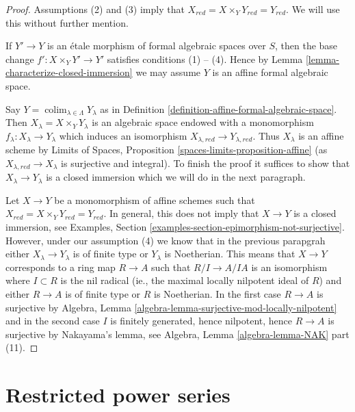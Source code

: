\documentclass{stacks-project}
\theoremstyle{plain}
\theoremstyle{definition}
\theoremstyle{remark}
\numberwithin{equation}{subsection}
\def\colim{\mathop{\mathrm{colim}}\nolimits}
\begin{document}
\begin{proof}
Assumptions (2) and (3) imply that
$X_{red} = X \times_Y Y_{red} = Y_{red}$.
We will use this without further mention.

\medskip\noindent
If $Y' \to Y$ is an \'etale morphism of formal algebraic spaces over $S$,
then the base change $f' : X \times_Y Y' \to Y'$ satisfies conditions
(1) -- (4). Hence by Lemma \ref{lemma-characterize-closed-immersion}
we may assume $Y$ is an affine formal algebraic space.

\medskip\noindent
Say $Y = \colim_{\lambda \in \Lambda} Y_\lambda$ as in
Definition \ref{definition-affine-formal-algebraic-space}.
Then $X_\lambda = X \times_Y Y_\lambda$ is an algebraic space
endowed with a monomorphism $f_\lambda : X_\lambda \to Y_\lambda$
which induces an isomorphism $X_{\lambda, red} \to Y_{\lambda, red}$.
Thus $X_\lambda$ is an affine scheme by
Limits of Spaces, Proposition \ref{spaces-limits-proposition-affine}
(as $X_{\lambda, red} \to X_\lambda$ is surjective and integral).
To finish the proof it suffices to show that
$X_\lambda \to Y_\lambda$ is a closed immersion
which we will do in the next paragraph.

\medskip\noindent
Let $X \to Y$ be a monomorphism of affine schemes such that
$X_{red} = X \times_Y Y_{red} = Y_{red}$. In general, this does
not imply that $X \to Y$ is a closed immersion, see
Examples, Section \ref{examples-section-epimorphism-not-surjective}.
However, under our assumption (4) we know that in the previous parapgrah
either $X_\lambda \to Y_\lambda$ is of finite type or $Y_\lambda$
is Noetherian. This means that
$X \to Y$ corresponds to a ring map $R \to A$ such that
$R/I \to A/IA$ is an isomorphism where $I \subset R$ is the
nil radical (ie., the maximal locally nilpotent ideal of $R$)
and either $R \to A$ is of finite type or $R$ is Noetherian.
In the first case $R \to A$ is surjective by
Algebra, Lemma \ref{algebra-lemma-surjective-mod-locally-nilpotent}
and in the second case $I$ is finitely generated, hence
nilpotent, hence $R \to A$ is surjective by Nakayama's lemma, see
Algebra, Lemma \ref{algebra-lemma-NAK} part (11).
\end{proof}








\section{Restricted power series}
\label{section-restricted-power-series}
\end{document}
